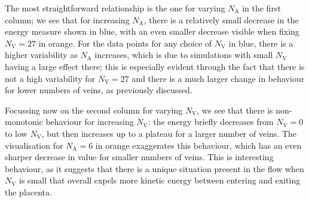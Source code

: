 
            The most straightforward relationship is the one for varying $N_\text{A}$ in the first column; we see that for increasing $N_\text{A}$, there is a relatively small decrease in the energy measure shown in blue, with an even smaller decrease visible when fixing $N_\text{V} = 27$ in orange. For the data points for any choice of $N_\text{V}$ in blue, there is a higher variability as $N_\text{A}$ increases, which is due to simulations with small $N_\text{V}$ having a large effect there; this is especially evident through the fact that there is not a high variability for $N_\text{V} = 27$ and there is a much larger change in behaviour for lower numbers of veins, as previously discussed.

            Focussing now on the second column for varying $N_\text{V}$, we see that there is non-monotonic behaviour for increasing $N_\text{V}$: the energy briefly decreases from $N_\text{V} = 0$ to low $N_\text{V}$, but then increases up to a plateau for a larger number of veins. The visualisation for $N_\text{A} = 6$ in orange exaggerates this behaviour, which has an even sharper decrease in value for smaller numbers of veins. This is interesting behaviour, as it suggests that there is a unique situation present in the flow when $N_\text{V}$ is small that overall expels more kinetic energy between entering and exiting the placenta.
            
